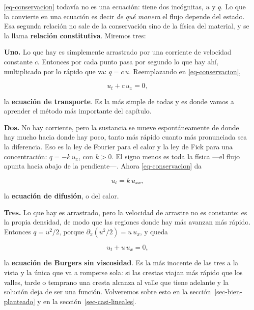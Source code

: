 \documentclass[
  spanish,
  a4paper,
]{scrbook}
\theoremstyle{definition}
\theoremstyle{plain}
\theoremstyle{definition}
\theoremstyle{plain}
\theoremstyle{definition}
\theoremstyle{remark}
\begin{document}
\ref{eq-conservacion} todavía no es una ecuación: tiene dos incógnitas,
\(u\) y \(q\). Lo que la convierte en una ecuación es decir \emph{de qué
manera} el flujo depende del estado. Esa segunda relación no sale de la
conservación sino de la física del material, y se la llama
\textbf{relación constitutiva}. Miremos tres:

\textbf{Uno.} Lo que hay es simplemente arrastrado por una corriente de
velocidad constante \(c\). Entonces por cada punto pasa por segundo lo
que hay ahí, multiplicado por lo rápido que va: \(q = c\,u\).
Reemplazando en \ref{eq-conservacion},

\[
u_t + c\,u_x = 0 ,
\]

la \textbf{ecuación de transporte}. Es la más simple de todas y es donde
vamos a aprender el método más importante del capítulo.

\textbf{Dos.} No hay corriente, pero la sustancia se mueve
espontáneamente de donde hay mucho hacia donde hay poco, tanto más
rápido cuanto más pronunciada sea la diferencia. Eso es la ley de
Fourier para el calor y la ley de Fick para una concentración:
\(q = -k\,u_x\), con \(k>0\). El signo menos es toda la física ---el
flujo apunta hacia abajo de la pendiente---. Ahora \ref{eq-conservacion}
da

\[
u_t = k\,u_{xx} ,
\]

la \textbf{ecuación de difusión}, o del calor.

\textbf{Tres.} Lo que hay es arrastrado, pero la velocidad de arrastre
no es constante: es la propia densidad, de modo que las regiones donde
hay más avanzan más rápido. Entonces \(q = u^2/2\), porque
\(\partial_x(u^2/2) = u\,u_x\), y queda

\[
u_t + u\,u_x = 0 ,
\]

la \textbf{ecuación de Burgers sin viscosidad}. Es la más inocente de
las tres a la vista y la única que va a romperse sola: si las crestas
viajan más rápido que los valles, tarde o temprano una cresta alcanza al
valle que tiene adelante y la solución deja de ser una función.
Volveremos sobre esto en la sección~\ref{sec-bien-planteado} y en la
sección~\ref{sec-casi-lineales}.
\end{document}
